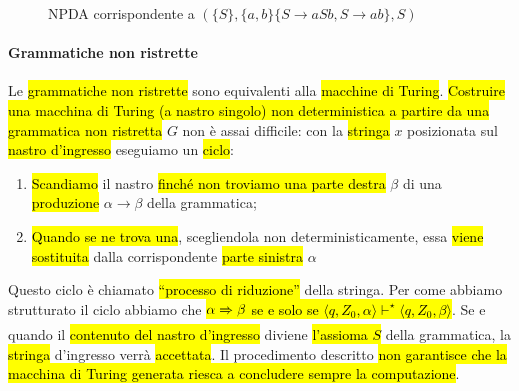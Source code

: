 \documentclass[a4paper,11pt,oneside]{article}
\theoremstyle{plain}
\theoremstyle{definition}
\theoremstyle{remark}
\newcommand*{\deriv}[1][]{\xRightarrow[#1]{}}
\begin{document}
\begin{figure}[htb]
  \centering
  \caption{NPDA corrispondente a $(\{S\}, \{a,b\} \{S \to aSb, S \to ab\}, S)$}%
  \label{fig:esempio-grammatica-to-npda}
\end{figure}

\paragraph{Grammatiche non ristrette} Le \hl{grammatiche non ristrette} sono
equivalenti alla \hl{macchine di Turing}. \hl{Costruire una macchina di Turing
(a nastro singolo) non deterministica a partire da una grammatica non ristretta}
$G$ non è assai difficile: con la \hl{stringa} $x$ posizionata sul \hl{nastro
d'ingresso} eseguiamo un \hl{ciclo}:

\begin{enumerate}
  \item \hl{Scandiamo} il nastro \hl{finché non troviamo una parte destra}
    $\beta$ di una \hl{produzione} $\alpha \to \beta$ della grammatica;
  \item \hl{Quando se ne trova una}, scegliendola non deterministicamente, essa
    \hl{viene sostituita} dalla corrispondente \hl{parte sinistra} $\alpha$
\end{enumerate}

Questo ciclo è chiamato \hl{``processo di riduzione''} della stringa. Per come
abbiamo strutturato il ciclo abbiamo che \hl{$\alpha \deriv \beta$ se e solo se
$\langle q, Z_0, \alpha \rangle \vdash^\star \langle q, Z_0, \beta \rangle$}. Se
e quando il \hl{contenuto del nastro d'ingresso} diviene \hl{l'assioma $S$}
della grammatica, la \hl{stringa} d'ingresso verrà \hl{accettata}. Il
procedimento descritto \hl{non garantisce che la macchina di Turing generata
riesca a concludere sempre la computazione}.
\end{document}
